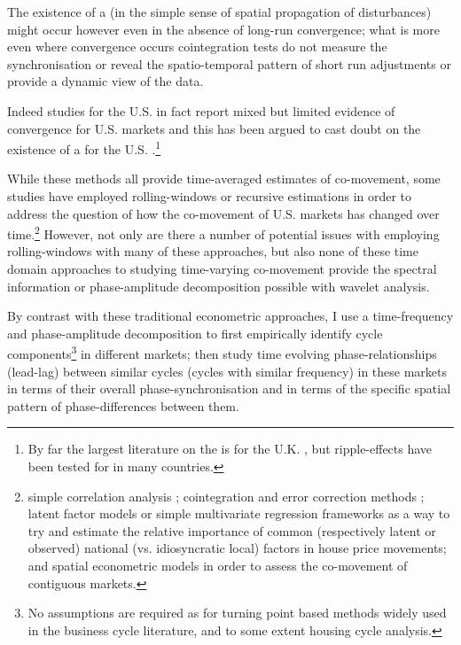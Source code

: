 \documentclass[11pt]{article}
\begin{document}
The existence of a  (in the simple sense of spatial propagation of disturbances) might occur however even in the absence of long-run convergence; what is more even where convergence occurs cointegration tests do not measure the synchronisation or reveal the spatio-temporal pattern of short run adjustments or provide a dynamic view of the data.%

Indeed studies for the U.S. in fact report mixed but limited evidence of convergence for U.S. markets and this has been argued to cast doubt on the existence of a  for the U.S. \citep{Clark2009,Pollakowski1997,Holmes2011,Zohrabyan2008,Holly2010,Gupta2012,Gil-Alana2014}.\footnote{By far the largest literature on the  is for the U.K. \citep{Meen1996,Meen1999}, but ripple-effects have been tested for in many countries.}

While these methods all provide time-averaged estimates of co-movement, some studies have employed rolling-windows or recursive estimations in order to address the question of how the co-movement of U.S. markets has changed over time.\footnote{simple correlation analysis \citep{Kallberg2014,Landier2017}%
; cointegration and error correction methods \citep{Yunus2013}%
; latent factor models \citep{DelNegro2007} or simple multivariate regression frameworks \citep{Cotter2011} as a way to try and estimate the relative importance of common (respectively latent or observed) national (vs. idiosyncratic local) factors in house price movements; and spatial econometric models \citep{Abate2016}  in order to assess the co-movement of contiguous markets.} However, not only are there a number of potential issues with employing rolling-windows with many of these approaches, but also none of these time domain approaches to studying time-varying co-movement provide the spectral information or phase-amplitude decomposition possible with wavelet analysis.

By contrast with %
these traditional econometric approaches, I use a time-frequency and phase-amplitude decomposition to first empirically identify cycle components\footnote{No assumptions are required as for turning point based methods widely used in the business cycle literature, and to some extent housing cycle analysis.} in different markets; then study time evolving phase-relationships (lead-lag) between similar cycles (cycles with similar frequency) in these markets in terms of their overall phase-synchronisation and in terms of the specific spatial pattern of phase-differences between them.
\end{document}
